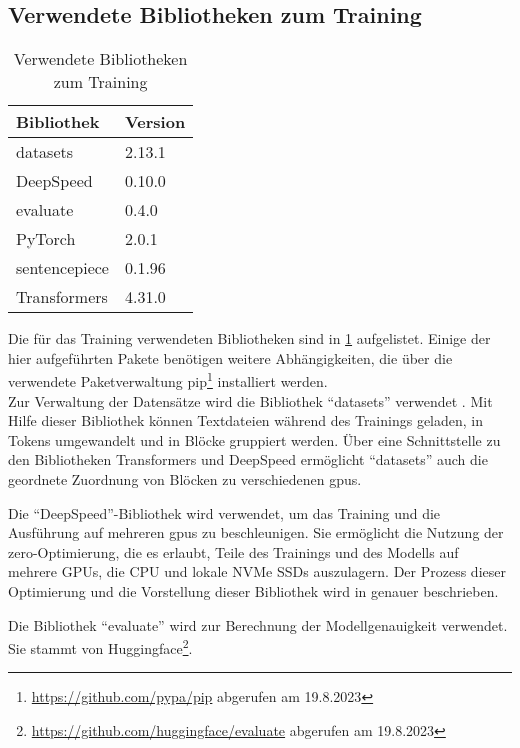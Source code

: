 \subsection{Verwendete Bibliotheken zum Training}
\begin{table}
    \centering
    \begin{tabular}{ll}
        \toprule
        \textbf{Bibliothek} & \textbf{Version} \\
        \midrule
        datasets            & 2.13.1           \\
        DeepSpeed           & 0.10.0           \\
        evaluate            & 0.4.0            \\
        PyTorch             & 2.0.1            \\
        sentencepiece       & 0.1.96           \\
        Transformers        & 4.31.0           \\
        \bottomrule
    \end{tabular}
    \caption{Verwendete Bibliotheken zum Training}
    \label{tab:training-libraries}
\end{table}
Die für das Training verwendeten Bibliotheken sind in \cref{tab:training-libraries} aufgelistet.
Einige der hier aufgeführten Pakete benötigen weitere Abhängigkeiten, die über die verwendete Paketverwaltung \ac{pip}\footnote{\url{https://github.com/pypa/pip} abgerufen am 19.8.2023} installiert werden.\\

Zur Verwaltung der Datensätze wird die Bibliothek \enquote{datasets} verwendet \citep{datasets}.
Mit Hilfe dieser Bibliothek können Textdateien während des Trainings geladen, in Tokens umgewandelt und in Blöcke gruppiert werden.
Über eine Schnittstelle zu den Bibliotheken Transformers und DeepSpeed ermöglicht \enquote{datasets} auch die geordnete Zuordnung von Blöcken zu verschiedenen \ac{gpu}s.

Die \enquote{DeepSpeed}-Bibliothek wird verwendet, um das Training und die Ausführung auf mehreren \ac{gpu}s zu beschleunigen.
Sie ermöglicht die Nutzung der \ac{zero}-Optimierung, die es erlaubt, Teile des Trainings und des Modells auf mehrere GPUs, die CPU und lokale NVMe SSDs auszulagern.
Der Prozess dieser Optimierung und die Vorstellung dieser Bibliothek wird in \citet{deepspeed} genauer beschrieben.

Die Bibliothek \enquote{evaluate} wird zur Berechnung der Modellgenauigkeit verwendet.
Sie stammt von Huggingface\footnote{\url{https://github.com/huggingface/evaluate} abgerufen am 19.8.2023}.\\

